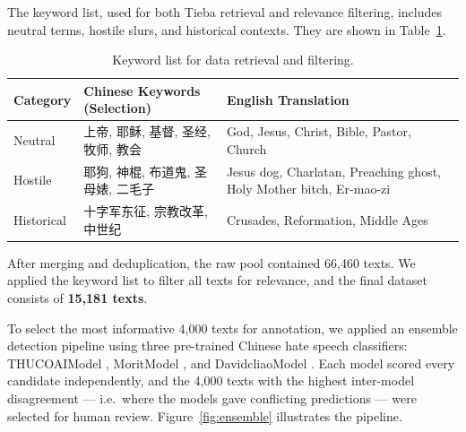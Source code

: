 \documentclass[../CLthesis.tex]{subfiles}
\begin{document}
The keyword list, used for both Tieba retrieval and relevance filtering, includes neutral terms, hostile slurs, and historical contexts. They are shown in Table~\ref{tab:keywords}.

\begin{table}[h]
\centering
\small
\begin{tabular}{lp{5cm}p{5cm}}
\hline
\textbf{Category} & \textbf{Chinese Keywords (Selection)} & \textbf{English Translation} \\ \hline
Neutral & 上帝, 耶稣, 基督, 圣经, 牧师, 教会 & God, Jesus, Christ, Bible, Pastor, Church \\
Hostile & 耶狗, 神棍, 布道鬼, 圣母婊, 二毛子 & Jesus dog, Charlatan, Preaching ghost, Holy Mother bitch, Er-mao-zi \\
Historical & 十字军东征, 宗教改革, 中世纪 & Crusades, Reformation, Middle Ages \\ \hline
\end{tabular}
\caption{Keyword list for data retrieval and filtering.}
\label{tab:keywords}
\end{table}

After merging and deduplication, the raw pool contained 66,460 texts. We applied the keyword list to filter all texts for relevance, and the final dataset consists of \textbf{15,181 texts}.

To select the most informative 4,000 texts for annotation, we applied an ensemble detection pipeline using three pre-trained Chinese hate speech classifiers: THUCOAIModel \citep{thucoai-roberta-cold}, MoritModel \citep{conneau2018xnlievaluatingcrosslingualsentence}, and DavidcliaoModel \citep{davidliao2024, Wang2022}. Each model scored every candidate independently, and the 4,000 texts with the highest inter-model disagreement --- i.e.\ where the models gave conflicting predictions --- were selected for human review. Figure~\ref{fig:ensemble} illustrates the pipeline.
\end{document}
